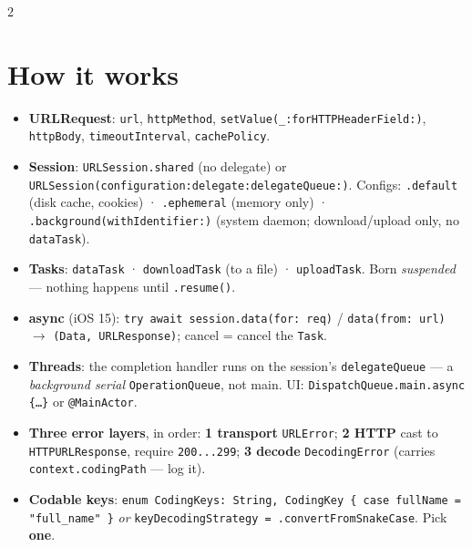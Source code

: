 \documentclass[8pt]{extarticle}
\begin{document}


\begin{multicols}{2}
\raggedright

\section{How it works}
\begin{itemize}
  \item \textbf{URLRequest}: \texttt{url}, \texttt{httpMethod}, \texttt{setValue(\_:forHTTPHeaderField:)},
        \texttt{httpBody}, \texttt{timeoutInterval}, \texttt{cachePolicy}.
  \item \textbf{Session}: \texttt{URLSession.shared} (no delegate) or
        \texttt{URLSession(configuration:\allowbreak delegate:\allowbreak delegateQueue:)}. Configs:
        \texttt{.default} (disk cache, cookies) · \texttt{.ephemeral} (memory only) ·
        \texttt{.background(withIdentifier:)} (system daemon; download/upload only, no \texttt{dataTask}).
  \item \textbf{Tasks}: \texttt{dataTask} · \texttt{downloadTask} (to a file) · \texttt{uploadTask}.
        Born \emph{suspended} — nothing happens until \texttt{.resume()}.
  \item \textbf{async} (iOS 15): \texttt{try await session.data(for: req)} /
        \texttt{data(from: url)} $\to$ \texttt{(Data, URLResponse)}; cancel = cancel the \texttt{Task}.
  \item \textbf{Threads}: the completion handler runs on the session's \texttt{delegateQueue}
        — a \emph{background serial} \texttt{OperationQueue}, not main. UI:
        \texttt{DispatchQueue.main.async \{…\}} or \texttt{@MainActor}.
  \item \textbf{Three error layers}, in order:
        \textbf{1 transport} \texttt{URLError};
        \textbf{2 HTTP} cast to \texttt{HTTPURLResponse}, require \texttt{200...299};
        \textbf{3 decode} \texttt{DecodingError} (carries \texttt{context.codingPath} — log it).
  \item \textbf{Codable keys}: \texttt{enum CodingKeys: String, CodingKey \{ case fullName = "full\_name" \}}
        \emph{or} \texttt{keyDecodingStrategy = .convertFromSnakeCase}. Pick \textbf{one}.

\end{itemize}
\end{multicols}
\end{document}
